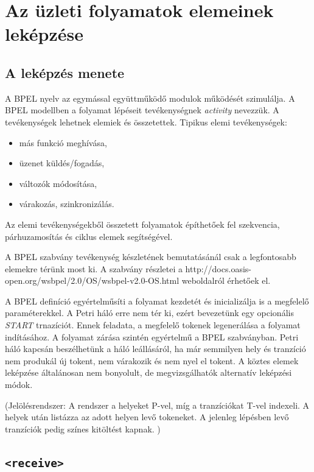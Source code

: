 \chapter{Az üzleti folyamatok elemeinek leképzése}


\section{A leképzés menete}
A BPEL nyelv az egymással együttműködő modulok működését szimulálja. A BPEL  modellben a folyamat lépéseit tevékenységnek \textsl{activity} nevezzük. A tevékenységek lehetnek elemiek és összetettek. Tipikus elemi tevékenységek:
\begin{itemize}
\item más funkció meghívása,
\item üzenet küldés/fogadás,
\item változók módosítása,
\item várakozás, szinkronizálás.
\end{itemize}
Az elemi tevékenységekből összetett folyamatok építhetőek fel szekvencia, párhuzamosítás és ciklus elemek segítségével.

A BPEL szabvány tevékenység készletének bemutatásánál csak a legfontosabb elemekre térünk most ki. A szabvány részletei a
http://docs.oasis-open.org/wsbpel/2.0/OS/wsbpel-v2.0-OS.html weboldalról érhetőek el. 

A BPEL definíció egyértelműsíti a folyamat kezdetét és inicializálja is a megfelelő paraméterekkel. A Petri háló erre nem tér ki, ezért bevezetünk egy opcionális \textit{START} trnazíciót. Ennek feladata, a megfelelő tokenek legenerálása a folyamat indításához. A folyamat zárása szintén egyértelmű a BPEL szabványban. Petri háló kapcsán beszélhetünk a háló leállásáról, ha már semmilyen hely és tranzíció nem produkál új tokent, nem várakozik és nem nyel el tokent. A köztes elemek leképzése általánosan nem bonyolult, de megvizsgálhatók alternatív leképzési módok. 

(Jelölésrendszer: A rendszer a helyeket P-vel, míg a tranzíciókat T-vel indexeli. A helyek után listázza az adott helyen levő tokeneket. A jelenleg lépésben levő tranzíciók pedig színes kitöltést kapnak. )

\section{\texttt{<receive>}}

